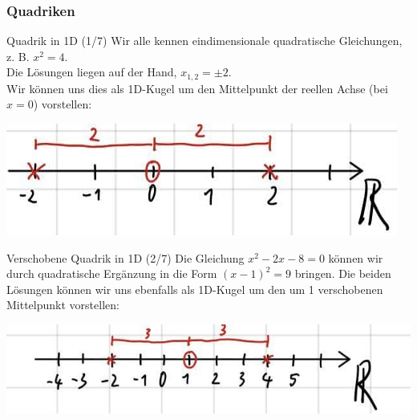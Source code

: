 \subsubsection{Quadriken}
\begin{Beispiel}
{Quadrik in 1D (1/7)}
Wir alle kennen eindimensionale quadratische Gleichungen, z. B. $\boxed{x^2=4}$.\\
Die Lösungen liegen auf der Hand, $x_{1,2}=\pm2$.\\
Wir können uns dies als 1D-Kugel um den Mittelpunkt der reellen Achse (bei $x=0$) vorstellen:
\begin{center}
    \includegraphics[width=.3\textwidth]{Dateien/05/05Quadrik1.jpg}
\end{center}
\end{Beispiel}
\begin{Beispiel}
{Verschobene Quadrik in 1D (2/7)}
Die Gleichung $\boxed{x^2-2x-8=0}$ können wir durch quadratische Ergänzung in die Form $(x-1)^2=9$ bringen. Die beiden Lösungen können wir uns ebenfalls als 1D-Kugel um den um 1 verschobenen Mittelpunkt vorstellen:
\begin{center}
    \includegraphics[width=.3\textwidth]{Dateien/05/05Quadrik2.jpg}
\end{center}
\end{Beispiel}

